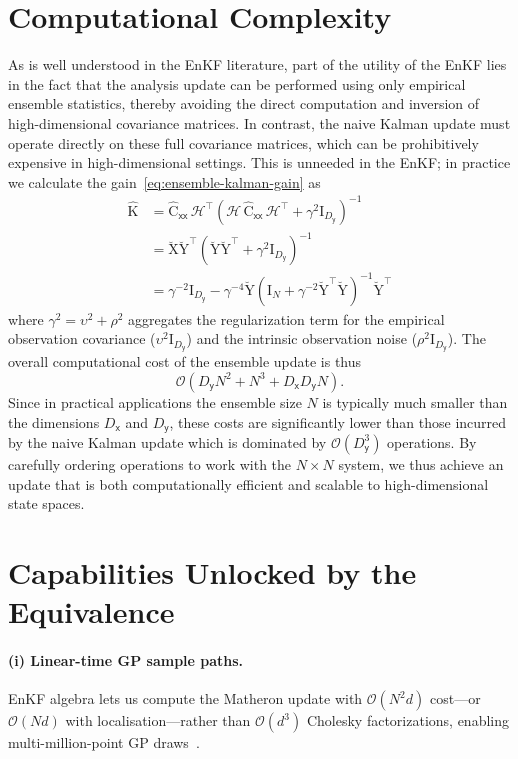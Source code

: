 \documentclass[wcp]{jmlr} %
\newcommand{\vv}[1]{\boldsymbol{#1}}
\newcommand{\mm}[1]{\mathrm{#1}}
\newcommand{\mmdev}[1]{\breve{\mathrm{#1}}}
\newcommand{\rv}[1]{\mathsf{#1}}
\newcommand{\vrv}[1]{\vv{\rv{#1}}}
\newcommand{\op}[1]{\mathcal{#1}}
\begin{document}
\section{Computational Complexity}
As is well understood in the EnKF literature, part of the  utility  of the EnKF lies in the fact that the analysis update can be performed using only empirical ensemble statistics, thereby avoiding the direct computation and inversion of high-dimensional covariance matrices.
In contrast, the naive Kalman update must operate directly on these full covariance matrices, which can be prohibitively expensive in high-dimensional settings.
This is unneeded in the EnKF; in practice we calculate the gain~\eqref{eq:ensemble-kalman-gain} as
\begin{align}
    \widehat{\mm{K}}&= \widehat{\mm{C}}_{\vrv{xx}}\, \op{H}^\top \left(\op{H}\,\widehat{\mm{C}}_{\vrv{xx}}\,\op{H}^\top + \gamma^2\mm{I}_{D_{\vrv{y}}}\right)^{-1}\\
    &= \mmdev{X} \mmdev{Y}^\top   \left(
        \mmdev{Y} \mmdev{Y}^\top + \gamma^2 \mm{I}_{D_{\vrv{y}}}
    \right)^{-1}\\
    &= \gamma^{-2}\mm{I}_{D_{\vrv{y}}}
    - \gamma^{-4}\mmdev{Y}
    \left(
        \mm{I}_N + \gamma^{-2}\mmdev{Y}^\top\mmdev{Y}
    \right)^{-1}
    \mmdev{Y}^\top
\end{align}
where \(\gamma^2 = \upsilon^2 + \rho^2\) aggregates the regularization term for the empirical observation covariance (\(\upsilon^2\mm{I}_{D_{\vrv{y}}}\)) and the intrinsic observation noise (\(\rho^2\mm{I}_{D_{\vrv{y}}}\)).
%
The overall computational cost of the ensemble update is thus
\[
    \mathcal{O}\left(D_{\vrv{y}}N^2 + N^3 + D_{\vrv{x}}D_{\vrv{y}}N\right).
\]
Since in practical applications the ensemble size \(N\) is typically much smaller than the dimensions \(D_{\vrv{x}}\) and \(D_{\vrv{y}}\), these costs are significantly lower than those incurred by the naive Kalman update which is dominated by \(\mathcal{O}(D_{\vrv{y}}^3)\) operations.
By carefully ordering operations to work with the \(N\times N\) system, we thus achieve an update that is both computationally efficient and scalable to high-dimensional state spaces.

\section{Capabilities Unlocked by the Equivalence}\label{sec:capabilities}

\paragraph{(i) Linear-time GP sample paths.}
EnKF algebra lets us compute the Matheron update with $\mathcal O(N^2d)$ cost—or $\mathcal O(Nd)$ with localisation—rather than $\mathcal O(d^{3})$ Cholesky factorizations, enabling multi-million-point GP draws~\citep{Wilson2020Efficiently,Hunt2007LETKF}.
\end{document}
